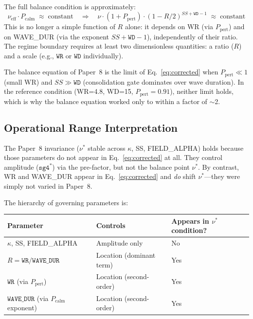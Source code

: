 \documentclass[11pt]{article}
\theoremstyle{remark}
\begin{document}
The full balance condition is approximately:
\begin{equation}
  \nu_{\text{eff}} \cdot P_{\text{calm}} \;\approx\; \text{constant}
  \quad \Rightarrow \quad
  \nu \cdot (1 + P_{\text{pert}}) \cdot (1-R/2)^{SS+\mathtt{WD}-1}
    \;\approx\; \text{constant}
  \label{eq:corrected}
\end{equation}
This is no longer a simple function of $R$ alone: it depends on WR (via
$P_{\text{pert}}$) and on WAVE\_DUR (via the exponent $SS + \mathtt{WD} - 1$),
independently of their ratio. The regime boundary requires at least two
dimensionless quantities: a ratio ($R$) and a scale (e.g., $\mathtt{WR}$ or
$\mathtt{WD}$ individually).

The balance equation of Paper~8 is the limit of Eq.~\eqref{eq:corrected} when
$P_{\text{pert}} \ll 1$ (small WR) and $SS \gg \mathtt{WD}$ (consolidation gate
dominates over wave duration). In the reference condition (WR=4.8, WD=15,
$P_{\text{pert}} = 0.91$), neither limit holds, which is why the balance equation
worked only to within a factor of $\sim$2.

\subsection{Operational Range Interpretation}

The Paper~8 invariance ($\nu^*$ stable across $\kappa$, SS, FIELD\_ALPHA) holds
because those parameters do not appear in Eq.~\eqref{eq:corrected} at all.
They control amplitude ($\mathtt{sg4}^*$) via the pre-factor, but not the balance
point $\nu^*$. By contrast, WR and WAVE\_DUR appear in Eq.~\eqref{eq:corrected}
and \emph{do} shift $\nu^*$---they were simply not varied in Paper~8.

The hierarchy of governing parameters is:
\begin{center}
\begin{tabular}{lll}
\toprule
Parameter & Controls & Appears in $\nu^*$ condition? \\
\midrule
$\kappa$, SS, FIELD\_ALPHA & Amplitude only & No \\
$R = \mathtt{WR}/\mathtt{WAVE\_DUR}$ & Location (dominant term) & Yes \\
$\mathtt{WR}$ (via $P_{\text{pert}}$) & Location (second-order) & Yes \\
$\mathtt{WAVE\_DUR}$ (via $P_{\text{calm}}$ exponent) & Location (second-order) & Yes \\
\bottomrule
\end{tabular}
\end{center}
\end{document}
